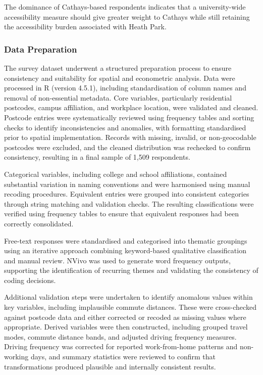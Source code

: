 \documentclass[11pt,a4paper]{article}
\begin{document}
The dominance of Cathays-based respondents indicates that a university-wide accessibility measure should give greater weight to Cathays while still retaining the accessibility burden associated with Heath Park.

\subsubsection{Data Preparation}

The survey dataset underwent a structured preparation process to ensure consistency and suitability for spatial and econometric analysis. Data were processed in R (version 4.5.1), including standardisation of column names and removal of non-essential metadata. Core variables, particularly residential postcodes, campus affiliation, and workplace location, were validated and cleaned. Postcode entries were systematically reviewed using frequency tables and sorting checks to identify inconsistencies and anomalies, with formatting standardised prior to spatial implementation. Records with missing, invalid, or non-geocodable postcodes were excluded, and the cleaned distribution was rechecked to confirm consistency, resulting in a final sample of 1,509 respondents.

Categorical variables, including college and school affiliations, contained substantial variation in naming conventions and were harmonised using manual recoding procedures. Equivalent entries were grouped into consistent categories through string matching and validation checks. The resulting classifications were verified using frequency tables to ensure that equivalent responses had been correctly consolidated.

Free-text responses were standardised and categorised into thematic groupings using an iterative approach combining keyword-based qualitative classification and manual review. NVivo was used to generate word frequency outputs, supporting the identification of recurring themes and validating the consistency of coding decisions.

Additional validation steps were undertaken to identify anomalous values within key variables, including implausible commute distances. These were cross-checked against postcode data and either corrected or recoded as missing values where appropriate. Derived variables were then constructed, including grouped travel modes, commute distance bands, and adjusted driving frequency measures. Driving frequency was corrected for reported work-from-home patterns and non-working days, and summary statistics were reviewed to confirm that transformations produced plausible and internally consistent results.
\end{document}
